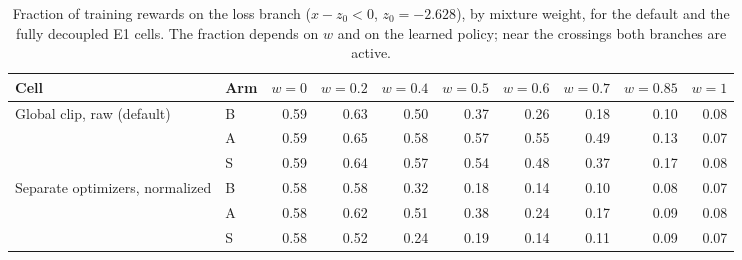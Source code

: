 \begin{table}[H]
\caption{Fraction of training rewards on the loss branch ($x-z_0<0$, $z_0=-2.628$), by mixture weight, for the default and the fully decoupled E1 cells. The fraction depends on $w$ and on the learned policy; near the crossings both branches are active.}
\label{tab:loss_occupancy}
\centering\scriptsize
\begin{tabular}{@{}llrrrrrrrr@{}}
\toprule
Cell & Arm & $w{=}0$ & $w{=}0.2$ & $w{=}0.4$ & $w{=}0.5$ & $w{=}0.6$ & $w{=}0.7$ & $w{=}0.85$ & $w{=}1$ \\
\midrule
Global clip, raw (default) & B & 0.59 & 0.63 & 0.50 & 0.37 & 0.26 & 0.18 & 0.10 & 0.08 \\
 & A & 0.59 & 0.65 & 0.58 & 0.57 & 0.55 & 0.49 & 0.13 & 0.07 \\
 & S & 0.59 & 0.64 & 0.57 & 0.54 & 0.48 & 0.37 & 0.17 & 0.08 \\
Separate optimizers, normalized & B & 0.58 & 0.58 & 0.32 & 0.18 & 0.14 & 0.10 & 0.08 & 0.07 \\
 & A & 0.58 & 0.62 & 0.51 & 0.38 & 0.24 & 0.17 & 0.09 & 0.08 \\
 & S & 0.58 & 0.52 & 0.24 & 0.19 & 0.14 & 0.11 & 0.09 & 0.07 \\
\bottomrule
\end{tabular}
\end{table}
